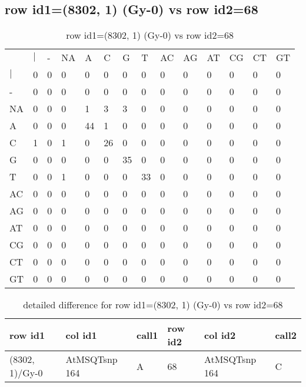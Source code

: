 \subsection{row id1=(8302, 1) (Gy-0) vs row id2=68}
\begin{center}
\begin{longtable}{|l|l|l|l|l|l|l|l|l|l|l|l|l|l|}
\caption{row id1=(8302, 1) (Gy-0) vs row id2=68} \label{table_dm478}\\
\hline
\\
\hline
&$|$&-&NA&A&C&G&T&AC&AG&AT&CG&CT&GT\\
$|$&0&0&0&0&0&0&0&0&0&0&0&0&0\\
-&0&0&0&0&0&0&0&0&0&0&0&0&0\\
NA&0&0&0&1&3&3&0&0&0&0&0&0&0\\
A&0&0&0&44&1&0&0&0&0&0&0&0&0\\
C&1&0&1&0&26&0&0&0&0&0&0&0&0\\
G&0&0&0&0&0&35&0&0&0&0&0&0&0\\
T&0&0&1&0&0&0&33&0&0&0&0&0&0\\
AC&0&0&0&0&0&0&0&0&0&0&0&0&0\\
AG&0&0&0&0&0&0&0&0&0&0&0&0&0\\
AT&0&0&0&0&0&0&0&0&0&0&0&0&0\\
CG&0&0&0&0&0&0&0&0&0&0&0&0&0\\
CT&0&0&0&0&0&0&0&0&0&0&0&0&0\\
GT&0&0&0&0&0&0&0&0&0&0&0&0&0\\
\hline
\end{longtable}
\end{center}

\begin{center}
\begin{longtable}{|l|l|l|l|l|l|}
\caption{detailed difference for row id1=(8302, 1) (Gy-0) vs row id2=68} \label{table_dm479}\\
\hline
row id1&col id1&call1&row id2&col id2&call2\\
\hline
(8302, 1)/Gy-0&AtMSQTsnp 164&A&68&AtMSQTsnp 164&C\\
\hline
\end{longtable}
\end{center}

